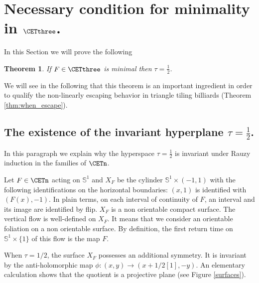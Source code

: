 \documentclass[12pt]{article}
\newtheorem{theorem}{Theorem}
\theoremstyle{definition}
\begin{document}
\section{Necessary condition for minimality in $\CETthree$.}\label{sec:one-half}
In this Section we will prove the following

\begin{theorem}\label{thm:first_ingredient}
If $F \in \CETthree$ is minimal then $\tau=\frac{1}{2}$.
\end{theorem}

We will see in the following that this theorem is an important ingredient in order to qualify the non-linearly escaping behavior in triangle tiling billiards (Theorem \ref{thm:when_escape}).


\subsection{The existence of the invariant hyperplane $\tau=\frac{1}{2}$.}

In this paragraph we explain why the hyperspace $\tau=\frac{1}{2}$ is invariant under Rauzy induction in the families of $\CETn$.

Let $F \in \CETn$ acting on $\mathbb{S}^1$ and $X_F$ be the cylinder $\mathbb{S}^1 \times (-1,1)$ with the following identifications on the horizontal boundaries:
$(x,1)$ is identified with $(F(x),-1)$. In plain terms, on each interval of continuity of $F$, an interval and its image are identified by flip.
$X_F$ is a non orientable compact surface.  The vertical flow is well-defined on $X_F$. It means that we consider an orientable foliation on a non orientable surface. By definition, the first return time on  $\mathbb{S}^1 \times \{ 1\}$ of this flow is the map $F$.

When $\tau = 1/2$, the surface $X_F$ possesses an additional symmetry. It is invariant by the anti-holomorphic map 
$\phi: (x,y) \to (x+1/2[1], -y)$. An elementary calculation shows that the quotient is a projective plane (see Figure \ref{surfaces}).
\end{document}

